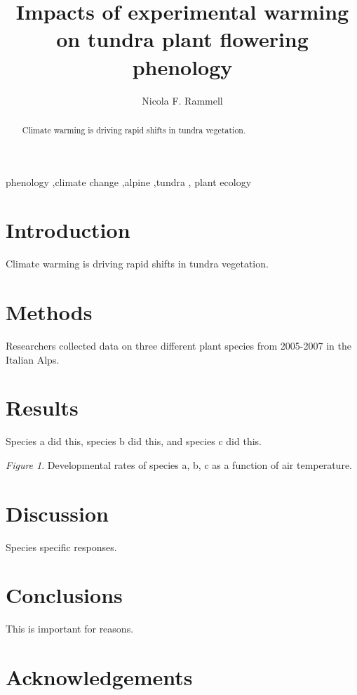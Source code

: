 \documentclass[preprint, 3p,
authoryear]{elsarticle} %
\begin{document}
\begin{frontmatter}

  \title{Impacts of experimental warming on tundra plant flowering
phenology}
    \author[The University of British Columbia]{Nicola F. Rammell%
  }
  
  \begin{abstract}
  Climate warming is driving rapid shifts in tundra vegetation.
  \end{abstract}
    \begin{keyword}
    phenology \sep climate change \sep alpine \sep tundra \sep 
    plant ecology
  \end{keyword}
  
 \end{frontmatter}

\hypertarget{introduction}{%
\section{Introduction}\label{introduction}}

Climate warming is driving rapid shifts in tundra vegetation.

\hypertarget{methods}{%
\section{Methods}\label{methods}}

Researchers collected data on three different plant species from
2005-2007 in the Italian Alps.

\hypertarget{results}{%
\section{Results}\label{results}}

Species a did this, species b did this, and species c did this.

\emph{Figure 1}. Developmental rates of species a, b, c as a function of
air temperature.

\hypertarget{discussion}{%
\section{Discussion}\label{discussion}}

Species specific responses.

\hypertarget{conclusions}{%
\section{Conclusions}\label{conclusions}}

This is important for reasons.

\hypertarget{acknowledgements}{%
\section{Acknowledgements}\label{acknowledgements}}

\renewcommand\refname{References}

\end{document}
